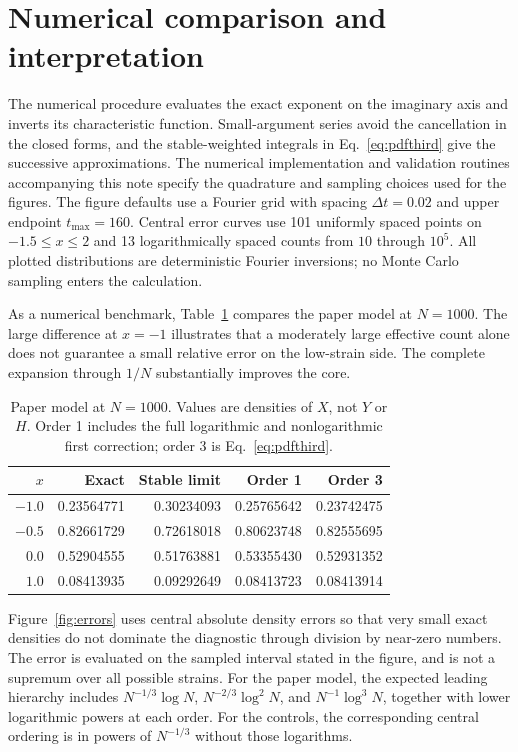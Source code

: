 \documentclass[11pt]{article}
\begin{document}
\section{Numerical comparison and interpretation}
\label{sec:numerics}

The numerical procedure evaluates the exact exponent on the imaginary axis
and inverts its characteristic function. Small-argument series avoid the
cancellation in the closed forms, and the stable-weighted integrals in
Eq.~\eqref{eq:pdfthird} give the successive approximations. The numerical
implementation and validation routines accompanying this note specify the
quadrature and sampling choices used for the figures.
The figure defaults use a Fourier grid with spacing $\Delta t=0.02$ and
upper endpoint $t_{\max}=160$. Central error curves use 101 uniformly spaced
points on $-1.5\leq x\leq2$ and 13 logarithmically spaced counts from $10$
through $10^5$. All plotted distributions are deterministic Fourier
inversions; no Monte Carlo sampling enters the calculation.

As a numerical benchmark, Table~\ref{tab:benchmark} compares the paper model
at $N=1000$. The large difference at $x=-1$ illustrates that a moderately
large effective count alone does not guarantee a small relative error on
the low-strain side. The complete expansion through $1/N$ substantially
improves the core.

\begin{table}[tbp]
 \centering
 \caption{Paper model at $N=1000$. Values are densities of $X$, not $Y$ or
 $H$. Order 1 includes the full logarithmic and nonlogarithmic first
 correction; order 3 is Eq.~\eqref{eq:pdfthird}.}
 \label{tab:benchmark}
 \begin{tabular}{rrrrr}
 \toprule
 $x$ & Exact & Stable limit & Order 1 & Order 3\\
 \midrule
 $-1.0$ & 0.23564771 & 0.30234093 & 0.25765642 & 0.23742475\\
 $-0.5$ & 0.82661729 & 0.72618018 & 0.80623748 & 0.82555695\\
 $ 0.0$ & 0.52904555 & 0.51763881 & 0.53355430 & 0.52931352\\
 $ 1.0$ & 0.08413935 & 0.09292649 & 0.08413723 & 0.08413914\\
 \bottomrule
 \end{tabular}
\end{table}

Figure~\ref{fig:errors} uses central absolute density errors so that very
small exact densities do not dominate the diagnostic through division by
near-zero numbers. The error is evaluated on the sampled interval stated
in the figure, and is not a supremum over all possible strains. For the
paper model, the expected leading hierarchy includes
$N^{-1/3}\log N$, $N^{-2/3}\log^2N$, and $N^{-1}\log^3N$, together with
lower logarithmic powers at each order. For the controls, the corresponding
central ordering is in powers of $N^{-1/3}$ without those logarithms.
\end{document}
